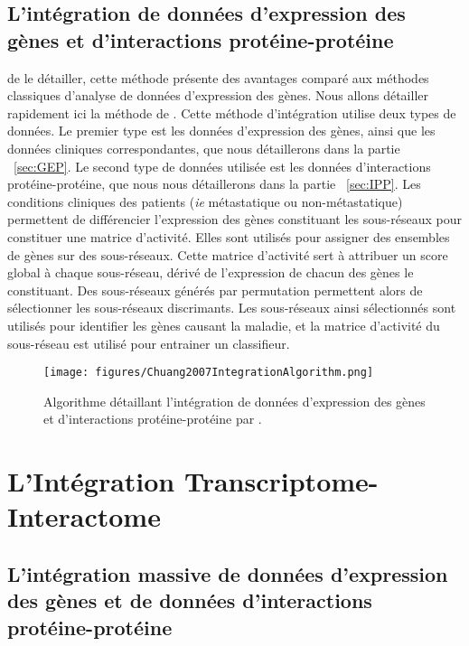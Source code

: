 			\pagebreak

		\subsection{\textcolor{green!45!black}{L'intégration de données d'expression des gènes et d'interactions protéine-protéine}}
			 de le détailler, cette méthode présente des avantages comparé aux méthodes classiques d'analyse de données d'expression des gènes.
			Nous allons détailler rapidement ici la méthode de \citeauthor{Chuang2007}.
			Cette méthode d'intégration utilise deux types de données.
			Le premier type est les données d'expression des gènes, ainsi que les données cliniques correspondantes, que nous détaillerons dans la partie ~\ref{sec:GEP}.
			Le second type de données utilisée est les données d'interactions protéine-protéine, que nous nous détaillerons dans la partie ~\ref{sec:IPP}.
			Les conditions cliniques des patients (\emph{ie} métastatique ou non-métastatique) permettent de différencier l'expression des gènes constituant les sous-réseaux pour constituer une matrice d'activité.
			Elles sont utilisés pour assigner des ensembles de gènes sur des sous-réseaux.
			Cette matrice d'activité sert à attribuer un score global à chaque sous-réseau, dérivé de l'expression de chacun des gènes le constituant.
			Des sous-réseaux générés par permutation permettent alors de sélectionner les sous-réseaux discrimants.
			Les sous-réseaux ainsi sélectionnés sont utilisés pour identifier les gènes causant la maladie, et la matrice d'activité du sous-réseau est utilisé pour entrainer un classifieur.

			\begin{figure}
				\centering
				\texttt{[image: figures/Chuang2007IntegrationAlgorithm.png]}
				\caption{Algorithme détaillant l'intégration de données d'expression des gènes et d'interactions protéine-protéine par \citeauthor{Chuang2007}.}
				\label{fig:Chuang2007IntegrationAlgorithm}
			\end{figure}
		
	\section{\textcolor{green!45!black}{L'Intégration Transcriptome-Interactome}}

		\subsection{\textcolor{green!45!black}{L'intégration massive de données d'expression des gènes et de données d'interactions protéine-protéine}}

